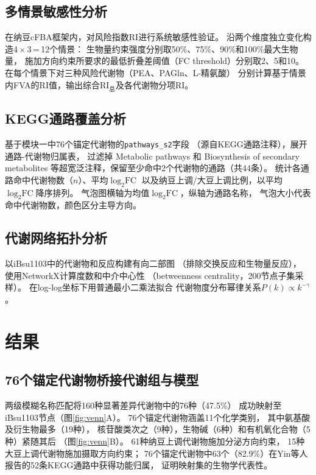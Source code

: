\documentclass[10pt, a4paper, twocolumn]{ctexart}
\newcommand{\ibsu}{iBsu1103}
\newcommand{\cfba}{cFBA}
\begin{document}
\subsection{多情景敏感性分析}

在纳豆\cfba{}框架内，对风险指数RI进行系统敏感性验证。
沿两个维度独立变化构造4\,$\times$\,3\,=\,12个情景：
生物量约束强度分别取50\%、75\%、90\%和100\%最大生物量，
施加方向约束所要求的最低折叠差阈值（FC threshold）分别取2、5和10。
在每个情景下对三种风险代谢物（PEA、PAGln、L-精氨酸）
分别计算基于情景内FVA的RI值，输出综合RI$_\text{总}$及各代谢物分项RI。

\subsection{KEGG通路覆盖分析}

基于模块一中76个锚定代谢物的\texttt{pathways\_s2}字段
（源自KEGG通路注释），展开通路-代谢物归属表，
过滤掉 Metabolic pathways 和 Biosynthesis of secondary metabolites
等超宽泛注释，保留至少命中2个代谢物的通路（共44条）。
统计各通路命中代谢物数（$n$）、平均$\log_2\text{FC}$
以及纳豆上调/大豆上调比例，以平均$\log_2\text{FC}$降序排列。
气泡图横轴为均值$\log_2\text{FC}$，纵轴为通路名称，
气泡大小代表命中代谢物数，颜色区分主导方向。

\subsection{代谢网络拓扑分析}

以\ibsu{}中的代谢物和反应构建有向二部图
（排除交换反应和生物量反应），
使用NetworkX\citep{Hagberg2008}计算度数和中介中心性
（betweenness centrality，200节点子集采样）。
在log-log坐标下用普通最小二乘法拟合
代谢物度分布幂律关系$P(k)\propto k^{-\gamma}$\citep{Newman2003}。

\section{结果}

\subsection{76个锚定代谢物桥接代谢组与模型}

两级模糊名称匹配将160种显著差异代谢物中的76种（47.5\%）
成功映射至\ibsu{}节点（图\ref{fig:venn}A）。
76个锚定代谢物涵盖11个化学类别，
其中氨基酸及衍生物最多（19种），
核苷酸类次之（9种），生物碱（6种）和有机氧化合物（5种）紧随其后
（图\ref{fig:venn}B）。
61种纳豆上调代谢物施加分泌方向约束，
15种大豆上调代谢物施加摄取方向约束；
76个锚定代谢物中63个（82.9\%）在Yin等人\citep{Yin2024}报告的52条KEGG通路中获得功能归属，
证明映射集的生物学代表性。
\end{document}
